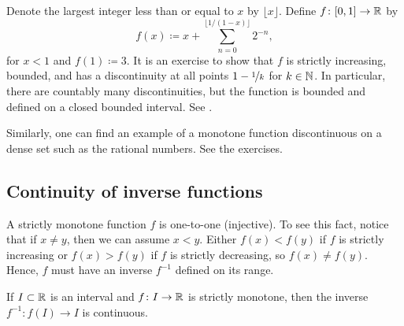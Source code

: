 \begin{example} \label{example:countdiscont}
Denote the largest integer less than or equal to $x$
by $\lfloor x \rfloor$.
Define $f \colon [0,1] \to {\mathbb{R}}$ by
\begin{equation*}
f(x) \coloneqq
x +
\sum_{n=0}^{\lfloor 1/(1-x) \rfloor}
2^{-n} ,
\end{equation*}
for $x < 1$ and $f(1) \coloneqq 3$.
It is an exercise to show that $f$ is strictly increasing, bounded, and
has a discontinuity at all points $1-\nicefrac{1}{k}$ for $k \in {\mathbb{N}}$.  In particular,
there are countably many discontinuities, but the function is bounded and
defined on a closed bounded interval.  See .
\begin{myfigureht}
\caption{Strictly increasing function on $[0,1]$ with countably many
discontinuities.\label{fig:countdiscont}}
\end{myfigureht}

Similarly, one can find an example of a monotone function discontinuous on a dense set
such as the rational numbers.  See the exercises.
\end{example}


\subsection{Continuity of inverse functions}


A strictly monotone function $f$ is one-to-one (injective).
To see this fact,
notice that if $x \neq y$, then we can assume $x < y$.  Either $f(x) <
f(y)$ if $f$ is strictly increasing or $f(x) > f(y)$ if $f$ is strictly
decreasing, so $f(x) \neq f(y)$.
Hence, $f$ must have an inverse $f^{-1}$ defined on its range.

\begin{prop} \label{prop:invcont}
If $I \subset {\mathbb{R}}$ is an interval and $f \colon I \to {\mathbb{R}}$ is strictly
monotone, then the inverse $f^{-1} \colon f(I) \to I$ is continuous.
\end{prop}

